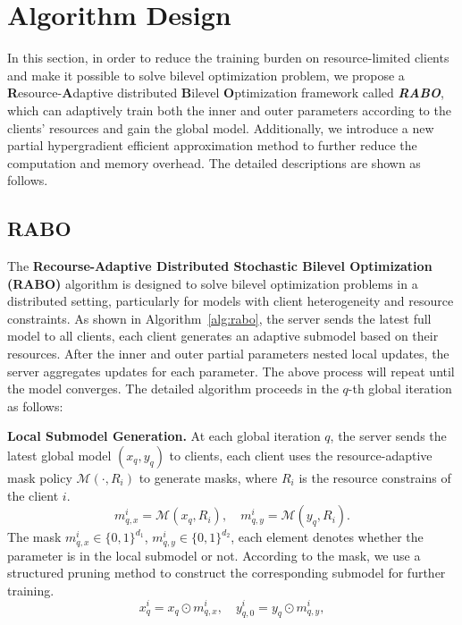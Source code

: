 \documentclass[lettersize,journal]{IEEEtran}
\begin{document}
\section{Algorithm Design}
In this section, in order to reduce the training burden on resource-limited clients and make it possible to solve bilevel optimization problem, we propose a \textbf{R}esource-\textbf{A}daptive distributed \textbf{B}ilevel \textbf{O}ptimization framework called \textit{\textbf{RABO}}, which can adaptively train both the inner and outer parameters according to the clients' resources and gain the global model. Additionally, we introduce a new partial hypergradient efficient approximation method to further reduce the computation and memory overhead. The detailed descriptions are shown as follows.

\subsection{RABO}
The \textbf{Recourse-Adaptive Distributed Stochastic Bilevel Optimization (RABO)} algorithm is designed to solve bilevel optimization problems in a distributed setting, particularly for models with client heterogeneity and resource constraints. As shown in Algorithm~\ref{alg:rabo}, the server sends the latest full model to all clients, each client generates an adaptive submodel based on their resources. After the inner and outer partial parameters nested local updates, the server aggregates updates for each parameter. The above process will repeat until the model converges. The detailed algorithm proceeds in the $q$-th global iteration as follows:

\textbf{Local Submodel Generation.} 
At each global iteration \( q \), the server sends the latest global model $(x_q, y_q)$ to clients, each client uses the resource-adaptive mask policy $\mathcal{M}(\cdot, R_i)$ to generate masks, where $R_i$ is the resource constrains of the client $i$.
\begin{equation}
    m^i_{q,x}=\mathcal{M}(x_{q},R_i),\quad m^i_{q,y}=\mathcal{M}(y_{q}, R_i).
\end{equation}
The mask $m^i_{q,x}\in\{0,1\}^{d_1}$,  $m^i_{q,y}\in\{0,1\}^{d_2}$, each element denotes whether the parameter is in the local submodel or not. 
According to the mask, we use a structured pruning method to construct the corresponding submodel for further training.
\begin{equation}
    x^i_{q} = x_q \odot m^i_{q,x},\quad  y^i_{q,0} = y_q \odot m^i_{q,y},
\end{equation}
\end{document}
